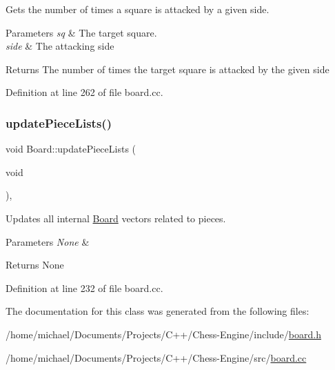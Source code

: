 Gets the number of times a square is attacked by a given side. 


\begin{DoxyParams}{Parameters}
{\em sq} & The target square. \\
\hline
{\em side} & The attacking side \\
\hline
\end{DoxyParams}
\begin{DoxyReturn}{Returns}
The number of times the target square is attacked by the given side 
\end{DoxyReturn}


Definition at line 262 of file board.\+cc.

\mbox{\label{classBoard_a2b86adf733a5509848f0cc689be49866}} 
\subsubsection{\texorpdfstring{update\+Piece\+Lists()}{updatePieceLists()}}
{\footnotesize\ttfamily void Board\+::update\+Piece\+Lists (\begin{DoxyParamCaption}\item[{void}]{ }\end{DoxyParamCaption})\hspace{0.3cm}{\ttfamily [private]}, {\ttfamily [noexcept]}}



Updates all internal \mbox{\hyperlink{classBoard}{Board}} vectors related to pieces. 


\begin{DoxyParams}{Parameters}
{\em None} & \\
\hline
\end{DoxyParams}
\begin{DoxyReturn}{Returns}
None 
\end{DoxyReturn}


Definition at line 232 of file board.\+cc.



The documentation for this class was generated from the following files\+:\begin{DoxyCompactItemize}
\item 
/home/michael/\+Documents/\+Projects/\+C++/\+Chess-\/\+Engine/include/\mbox{\hyperlink{board_8h}{board.\+h}}\item 
/home/michael/\+Documents/\+Projects/\+C++/\+Chess-\/\+Engine/src/\mbox{\hyperlink{board_8cc}{board.\+cc}}\end{DoxyCompactItemize}
